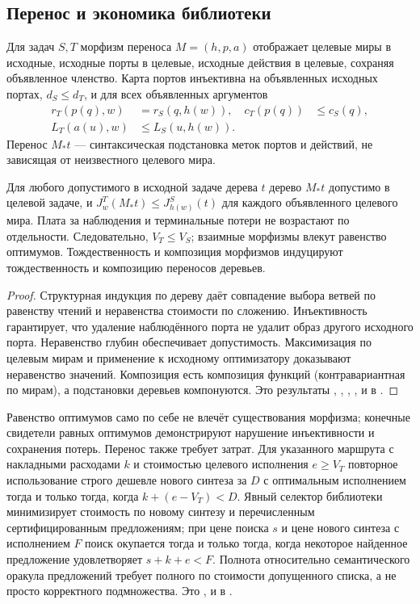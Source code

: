 \subsection{Перенос и экономика библиотеки}
Для задач $S,T$ морфизм переноса $M=(h,p,a)$ отображает целевые миры в исходные, исходные порты в целевые, исходные действия в целевые, сохраняя объявленное членство. Карта портов инъективна на объявленных исходных портах, $d_S\le d_T$, и для всех объявленных аргументов
\begin{align*}
 r_T(p(q),w)&=r_S(q,h(w)), & c_T(p(q))&\le c_S(q),\\
 L_T(a(u),w)&\le L_S(u,h(w)).
\end{align*}
Перенос $M_*t$ --- синтаксическая подстановка меток портов и действий, не зависящая от неизвестного целевого мира.
\begin{theorem}\label{thm:transfer}
Для любого допустимого в исходной задаче дерева $t$ дерево $M_*t$ допустимо в целевой задаче, и $J^T_w(M_*t)\le J^S_{h(w)}(t)$ для каждого объявленного целевого мира. Плата за наблюдения и терминальные потери не возрастают по отдельности. Следовательно, $V_T\le V_S$; взаимные морфизмы влекут равенство оптимумов. Тождественность и композиция морфизмов индуцируют тождественность и композицию переносов деревьев.
\end{theorem}
\begin{proof}
Структурная индукция по дереву даёт совпадение выбора ветвей по равенству чтений и неравенства стоимости по сложению. Инъективность гарантирует, что удаление наблюдённого порта не удалит образ другого исходного порта. Неравенство глубин обеспечивает допустимость. Максимизация по целевым мирам и применение к исходному оптимизатору доказывают неравенство значений. Композиция есть композиция функций (контравариантная по мирам), а подстановки деревьев компонуются. Это результаты , , , ,  и  в .
\end{proof}
Равенство оптимумов само по себе не влечёт существования морфизма; конечные свидетели равных оптимумов демонстрируют нарушение инъективности и сохранения потерь. Перенос также требует затрат. Для указанного маршрута с накладными расходами $k$ и стоимостью целевого исполнения $e\ge V_T$ повторное использование строго дешевле нового синтеза за $D$ с оптимальным исполнением тогда и только тогда, когда $k+(e-V_T)<D$. Явный селектор библиотеки минимизирует стоимость по новому синтезу и перечисленным сертифицированным предложениям; при цене поиска $s$ и цене нового синтеза с исполнением $F$ поиск окупается тогда и только тогда, когда некоторое найденное предложение удовлетворяет $s+k+e<F$. Полнота относительно семантического оракула предложений требует полного по стоимости допущенного списка, а не просто корректного подмножества. Это ,  и  в .

